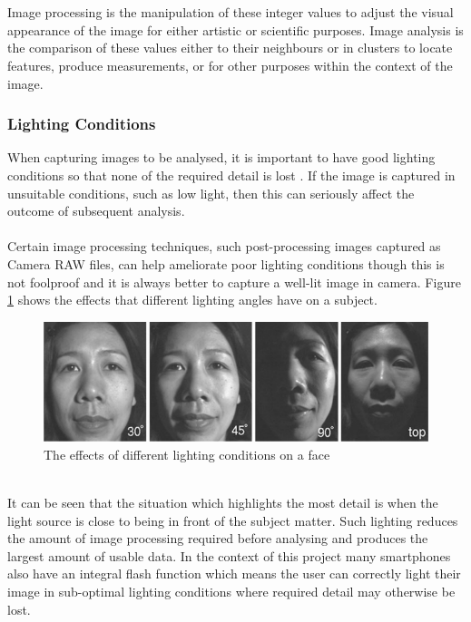		\\\\
		Image processing is the manipulation of these integer values to adjust the visual appearance of the image for either artistic or scientific purposes. Image analysis is the comparison of these values either to their neighbours or in clusters to locate features, produce measurements, or for other purposes within the context of the image.
	\subsubsection{Lighting Conditions}
		When capturing images to be analysed, it is important to have good lighting conditions so that none of the required detail is lost \citep{introtoprocessing}. If the image is captured in unsuitable conditions, such as low light, then this can seriously affect the outcome of subsequent analysis. 
		\\\\
		Certain image processing techniques, such post-processing images captured as Camera RAW files, can help ameliorate poor lighting conditions though this is not foolproof and it is always better to capture a well-lit image in camera. Figure \ref{fig:illumination} shows the effects that different lighting angles have on a subject.
		\begin{figure}[h!]
			\centering
			\includegraphics[width=\linewidth]{../images/face_illumination.png}
			\caption[]{The effects of different lighting conditions on a face \citep{introtoprocessing}}
			\label{fig:illumination}
		\end{figure}\\
		It can be seen that the situation which highlights the most detail is when the light source is close to being in front of the subject matter. Such lighting reduces the amount of image processing required before analysing and produces the largest amount of usable data. In the context of this project many smartphones also have an integral flash function which means the user can correctly light their image in sub-optimal lighting conditions where required detail may otherwise be lost.

